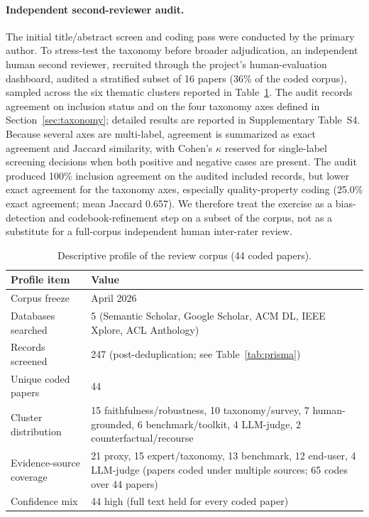 \documentclass[twoside,11pt]{article}
\begin{document}
\paragraph{Independent second-reviewer audit.}
The initial title/abstract screen and coding pass were conducted by the
primary author. To stress-test the taxonomy before broader adjudication, an
independent human second reviewer, recruited through the project's
human-evaluation dashboard, audited a stratified subset of 16 papers
(36\% of the coded corpus), sampled across the six thematic clusters
reported in Table~\ref{tab:corpus_profile}. The audit records
agreement on inclusion status and on the four taxonomy axes defined in
Section~\ref{sec:taxonomy}; detailed results are reported in
Supplementary Table~S4. Because several axes are multi-label, agreement
is summarized as exact agreement and Jaccard similarity, with Cohen's
$\kappa$ reserved for single-label screening decisions when both positive
and negative cases are present. The audit produced 100\% inclusion
agreement on the audited included records, but lower exact agreement for
the taxonomy axes, especially quality-property coding (25.0\% exact
agreement; mean Jaccard 0.657). We therefore treat the exercise as a
bias-detection and codebook-refinement step on a subset of the corpus, not
as a substitute for a full-corpus independent human inter-rater review.

\begin{table}[t]
\centering
\caption{Descriptive profile of the review corpus (44 coded papers).}
\begin{tabularx}{\linewidth}{l X}
\toprule
\textbf{Profile item} & \textbf{Value} \\
\midrule
Corpus freeze & April 2026 \\
Databases searched & 5 (Semantic Scholar, Google Scholar, ACM DL, IEEE Xplore, ACL Anthology) \\
Records screened & 247 (post-deduplication; see Table~\ref{tab:prisma}) \\
Unique coded papers & 44 \\
Cluster distribution & 15 faithfulness/robustness, 10 taxonomy/survey, 7 human-grounded, 6 benchmark/toolkit, 4 LLM-judge, 2 counterfactual/recourse \\
Evidence-source coverage & 21 proxy, 15 expert/taxonomy, 13 benchmark, 12 end-user, 4 LLM-judge (papers coded under multiple sources; 65 codes over 44 papers) \\
Confidence mix & 44 high (full text held for every coded paper) \\
\bottomrule
\end{tabularx}
\label{tab:corpus_profile}
\end{table}
\end{document}

